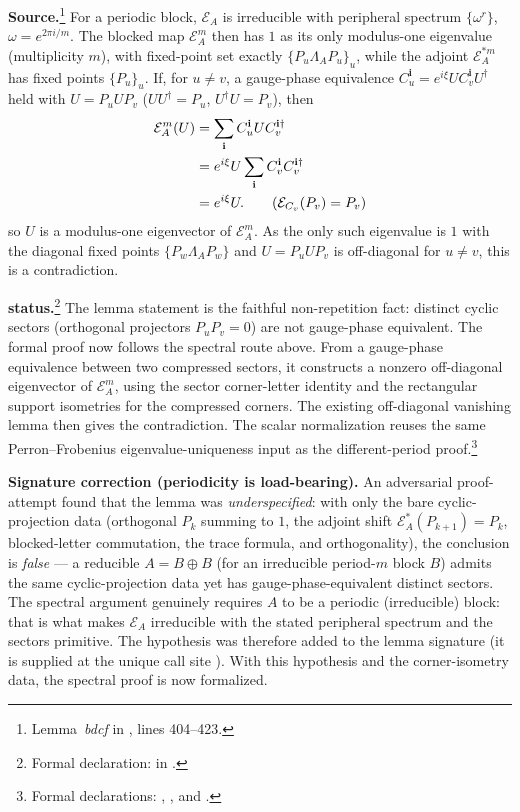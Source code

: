 \documentclass{article}
\begin{document}
\textbf{Source.}\footnote{Lemma~\emph{bdcf} in
\cite{DeLasCuevas2017Irreducible}, lines 404--423.} For a periodic block,
$\mathcal E_A$ is irreducible with peripheral spectrum $\{\omega^r\}$,
$\omega=e^{2\pi i/m}$. The blocked map $\mathcal E_A^m$ then has $1$ as its only
modulus-one eigenvalue (multiplicity $m$), with fixed-point set exactly
$\{P_u\Lambda_AP_u\}_u$, while the adjoint $\mathcal E_A^{*m}$ has fixed points
$\{P_u\}_u$. If, for $u\neq v$, a gauge-phase equivalence
$C_u^{\mathbf i}=e^{i\xi}UC_v^{\mathbf i}U^\dagger$ held with $U=P_uUP_v$
($UU^\dagger=P_u$, $U^\dagger U=P_v$), then
\begin{align}
    \mathcal E_A^m(U)
        &= \sum_{\mathbf i} C_u^{\mathbf i}UC_v^{\mathbf i\dagger} \\
        &= e^{i\xi}U
           \sum_{\mathbf i} C_v^{\mathbf i}C_v^{\mathbf i\dagger} \\
        &= e^{i\xi}U .
        \tag{$\mathcal E_{C_v}(P_v)=P_v$}
\end{align}
so $U$ is a modulus-one eigenvector of $\mathcal E_A^m$. As the only such
eigenvalue is $1$ with the diagonal fixed points $\{P_w\Lambda_AP_w\}$ and
$U=P_uUP_v$ is off-diagonal for $u\neq v$, this is a contradiction.

\textbf{\Lean{} status.}\footnote{Formal declaration:
 in
.} The lemma statement is the faithful non-repetition fact:
distinct cyclic sectors (orthogonal projectors $P_uP_v=0$) are not gauge-phase
equivalent. The formal proof now follows the spectral route above.  From a
gauge-phase equivalence between two compressed sectors, it constructs a nonzero
off-diagonal eigenvector of $\mathcal E_A^m$, using the sector corner-letter
identity and the rectangular support isometries for the compressed corners.  The
existing off-diagonal vanishing lemma then gives the contradiction.  The scalar
normalization reuses the same Perron--Frobenius eigenvalue-uniqueness input as
the different-period proof.\footnote{Formal declarations:
,
, and
.}

\textbf{Signature correction (periodicity is load-bearing).} An adversarial
proof-attempt found that the lemma was \emph{underspecified}: with only the bare
cyclic-projection data (orthogonal $P_k$ summing to $1$, the adjoint shift
$\mathcal E_A^{*}(P_{k+1})=P_k$, blocked-letter commutation, the trace formula,
and orthogonality), the conclusion is \emph{false} --- a reducible $A=B\oplus B$
(for an irreducible period-$m$ block $B$) admits the same cyclic-projection data
yet has gauge-phase-equivalent distinct sectors. The spectral argument genuinely
requires $A$ to be a periodic (irreducible) block: that is what makes $\mathcal
E_A$ irreducible with the stated peripheral spectrum and the sectors primitive.
The hypothesis  was therefore added to the lemma
signature (it is supplied at the unique call site
). With this hypothesis and the
corner-isometry data, the spectral proof is now formalized.
\end{document}
